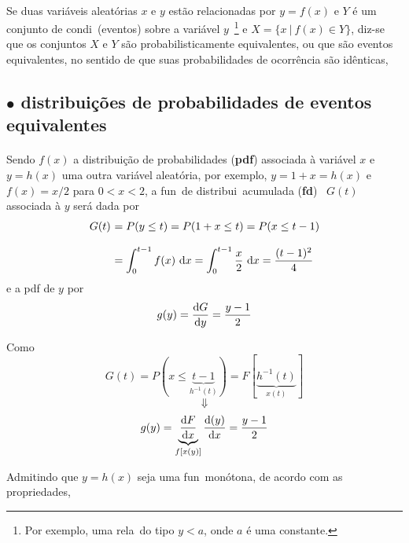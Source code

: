 \paragraph*{}
Se duas vari\'aveis aleat\'orias
$x$ e $y$ est\~ao relacionadas por $y=f(x)$  e $Y$ \'e um conjunto de
condi\coes\ (eventos) sobre a vari\'avel $y$~\footnote{Por exemplo,
uma rela\cao\ do tipo $y < a$, onde $a$ \'e uma constante.}
e $X = \{ x \ | \ f(x) \in Y \}$, diz-se que os conjuntos $X$ e $Y$ s\~ao
pro\-ba\-bi\-lis\-ti\-ca\-men\-te e\-qui\-va\-len\-tes, ou que
s\~ao eventos e\-qui\-va\-len\-tes, no sentido de que
suas probabilidades de ocorr\^encia s\~ao id\^enticas,

\vspace{.5cm}
\centerline{}

\subsection*{$\bullet$ distribui\c{c}\~{o}es de probabilidades de eventos equivalentes}

\paragraph*{}
Sendo $f(x)$  a distribui\c{c}\~{a}o de probabilidades ({\bf pdf}) associada \`a vari\'avel $x$  e $y=h(x)$  uma outra vari\'avel aleat\'oria, por exemplo, $y=1+x=h(x)$ e $f(x) =x/2$ para $0 < x < 2$, a fun\cao\ de distribui\cao\  acumulada ({\bf fd})  \ $G(t)$ associada \`a $y$  ser\'a dada por
$$
\begin{array}{ll}
G(t) \! \! \! \! & =P(y\leq  t)  = P(1+x \leq t )  = P(x\leq t-1) \\
   \  \\
     &= \displaystyle \int_0^{t-1} f(x) \ {\rm d}x = \displaystyle \int_0^{t-1} \frac{x}{2} \ {\rm d}x
       = \frac{(t-1)^2}{4}
\end{array}
$$
\noindent e a pdf de $y$ por
$$g(y)= \frac{{\rm d}G}{{\rm d}y} = \frac{y-1}{2} $$

Como
$$ G(t) = P (x \leq \underbrace{t-1}_{h^{-1} (t)} ) =
F [ \underbrace{h^{-1} (t)}_{x(t)} ]$$
$$  \Downarrow $$
$$g(y) = \underbrace{\frac{{\rm d}F}{{\rm d}x}}_{f[x(y)]}
     \frac{{\rm d}(y)}{{\rm d}x}  = \frac{y-1}{2}$$

Admitindo que  $y=h(x)$ seja  uma fun\cao\ mon\'otona, de acordo com as propriedades,

